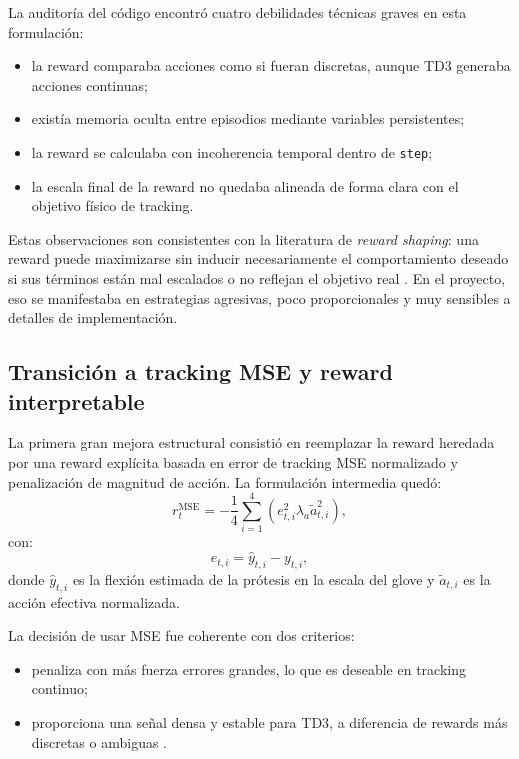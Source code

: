 \documentclass[11pt,a4paper]{article}
\begin{document}
La auditor\'ia del c\'odigo encontr\'o cuatro debilidades t\'ecnicas graves en esta formulaci\'on:
\begin{itemize}[leftmargin=1.2cm]
    \item la reward comparaba acciones como si fueran discretas, aunque TD3 generaba acciones continuas;
    \item exist\'ia memoria oculta entre episodios mediante variables persistentes;
    \item la reward se calculaba con incoherencia temporal dentro de \texttt{step};
    \item la escala final de la reward no quedaba alineada de forma clara con el objetivo f\'isico de tracking.
\end{itemize}

Estas observaciones son consistentes con la literatura de \emph{reward shaping}: una reward puede maximizarse sin inducir necesariamente el comportamiento deseado si sus t\'erminos est\'an mal escalados o no reflejan el objetivo real \citep{deng2025reward}. En el proyecto, eso se manifestaba en estrategias agresivas, poco proporcionales y muy sensibles a detalles de implementaci\'on.

\subsection{Transici\'on a tracking MSE y reward interpretable}

La primera gran mejora estructural consisti\'o en reemplazar la reward heredada por una reward expl\'icita basada en error de tracking MSE normalizado y penalizaci\'on de magnitud de acci\'on. La formulaci\'on intermedia qued\'o:
\begin{equation}
r_t^{\text{MSE}}
=
-
\frac{1}{4}\sum_{i=1}^{4}
\left(
e_{t,i}^{2}
\lambda_a \tilde{a}_{t,i}^{2}
\right),
\end{equation}
con:
\begin{equation}
e_{t,i} = \hat{y}_{t,i} - y_{t,i},
\end{equation}
donde \(\hat{y}_{t,i}\) es la flexi\'on estimada de la pr\'otesis en la escala del glove y \(\tilde{a}_{t,i}\) es la acci\'on efectiva normalizada.

La decisi\'on de usar MSE fue coherente con dos criterios:
\begin{itemize}[leftmargin=1.2cm]
    \item penaliza con m\'as fuerza errores grandes, lo que es deseable en tracking continuo;
    \item proporciona una se\~nal densa y estable para TD3, a diferencia de rewards m\'as discretas o ambiguas \citep{fujimoto2018td3,mathworks_td3_options}.
\end{itemize}
\end{document}
